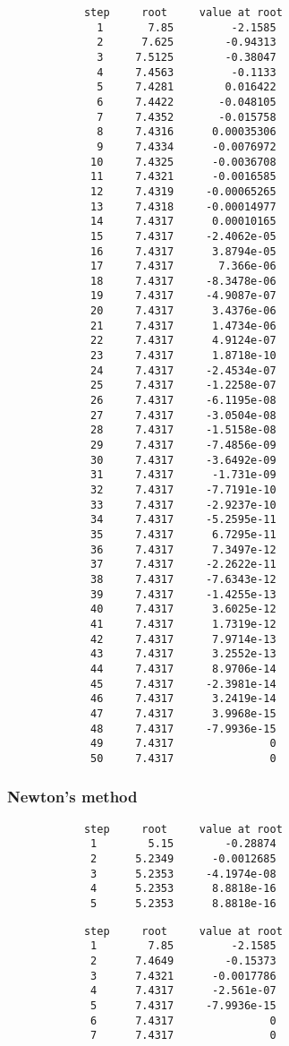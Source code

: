 \documentclass{article}
\begin{document}
	\begin{multicols}{2}
		\begin{verbatim}
			step     root     value at root
			  1       7.85         -2.1585 
			  2      7.625        -0.94313 
			  3     7.5125        -0.38047 
			  4     7.4563         -0.1133 
			  5     7.4281        0.016422 
			  6     7.4422       -0.048105 
			  7     7.4352       -0.015758 
			  8     7.4316      0.00035306 
			  9     7.4334      -0.0076972 
			 10     7.4325      -0.0036708 
			 11     7.4321      -0.0016585 
			 12     7.4319     -0.00065265 
			 13     7.4318     -0.00014977 
			 14     7.4317      0.00010165 
			 15     7.4317     -2.4062e-05 
			 16     7.4317      3.8794e-05 
			 17     7.4317       7.366e-06 
			 18     7.4317     -8.3478e-06 
			 19     7.4317     -4.9087e-07 
			 20     7.4317      3.4376e-06 
			 21     7.4317      1.4734e-06 
			 22     7.4317      4.9124e-07 
			 23     7.4317      1.8718e-10 
			 24     7.4317     -2.4534e-07 
			 25     7.4317     -1.2258e-07 
			 26     7.4317     -6.1195e-08 
			 27     7.4317     -3.0504e-08 
			 28     7.4317     -1.5158e-08 
			 29     7.4317     -7.4856e-09 
			 30     7.4317     -3.6492e-09 
			 31     7.4317      -1.731e-09 
			 32     7.4317     -7.7191e-10 
			 33     7.4317     -2.9237e-10 
			 34     7.4317     -5.2595e-11 
			 35     7.4317      6.7295e-11 
			 36     7.4317      7.3497e-12 
			 37     7.4317     -2.2622e-11 
			 38     7.4317     -7.6343e-12 
			 39     7.4317     -1.4255e-13 
			 40     7.4317      3.6025e-12 
			 41     7.4317      1.7319e-12 
			 42     7.4317      7.9714e-13 
			 43     7.4317      3.2552e-13 
			 44     7.4317      8.9706e-14 
			 45     7.4317     -2.3981e-14 
			 46     7.4317      3.2419e-14 
			 47     7.4317      3.9968e-15 
			 48     7.4317     -7.9936e-15 
			 49     7.4317               0 
			 50     7.4317               0 
		\end{verbatim}
	\end{multicols}
	
	\subsubsection{Newton's method}
	
	\begin{multicols}{2}
		\begin{verbatim}
			step     root     value at root
			 1        5.15        -0.28874 
			 2      5.2349      -0.0012685 
			 3      5.2353     -4.1974e-08 
			 4      5.2353      8.8818e-16 
			 5      5.2353      8.8818e-16 
		\end{verbatim}
		\begin{verbatim}
			step     root     value at root
			 1        7.85         -2.1585 
			 2      7.4649        -0.15373 
			 3      7.4321      -0.0017786 
			 4      7.4317      -2.561e-07 
			 5      7.4317     -7.9936e-15 
			 6      7.4317               0 
			 7      7.4317               0 
		\end{verbatim}
	\end{multicols}
	
\end{document}
